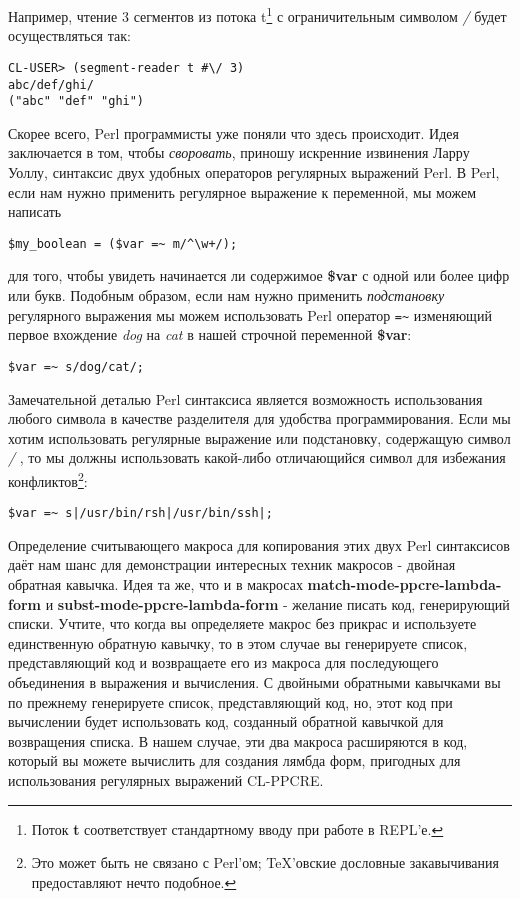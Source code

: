 Например, чтение 3 сегментов из потока t\footnote{Поток \textbf{t} соответствует стандартному вводу при работе в REPL'е.} с ограничительным символом \emph{/} будет осуществляться так:

\begin{verbatim}
CL-USER> (segment-reader t #\/ 3)
abc/def/ghi/
("abc" "def" "ghi")
\end{verbatim}

Скорее всего, Perl программисты уже поняли что здесь происходит. Идея заключается в том, чтобы \emph{своровать}, приношу искренние извинения Ларру Уоллу, синтаксис двух удобных операторов регулярных выражений Perl. В Perl, если нам нужно применить регулярное выражение к переменной, мы можем написать

\begin{verbatim}
$my_boolean = ($var =~ m/^\w+/);
\end{verbatim}

для того, чтобы увидеть начинается ли содержимое \textbf{\$var} с одной или более цифр или букв. Подобным образом, если нам нужно применить \emph{подстановку} регулярного выражения мы можем использовать Perl оператор \verb"=~" изменяющий первое вхождение \emph{dog} на \emph{cat} в нашей строчной переменной \textbf{\$var}:

\begin{verbatim}
$var =~ s/dog/cat/;
\end{verbatim}

Замечательной деталью Perl синтаксиса является возможность использования любого символа в качестве разделителя для удобства программирования. Если мы хотим использовать регулярные выражение или подстановку, содержащую символ \emph{/} , то мы должны использовать какой-либо отличающийся символ для избежания конфликтов\footnote{Это может быть не связано с Perl'ом; \TeX'овские дословные закавычивания предоставляют нечто подобное.}:

\begin{verbatim}
$var =~ s|/usr/bin/rsh|/usr/bin/ssh|;
\end{verbatim}

Определение считывающего макроса для копирования этих двух Perl синтаксисов даёт нам шанс для демонстрации интересных техник макросов - двойная обратная кавычка. Идея та же, что и в макросах \textbf{match-mode-ppcre-lambda-form} и \textbf{subst-mode-ppcre-lambda-form} - желание писать код, генерирующий списки. Учтите, что когда вы определяете макрос без прикрас и используете единственную обратную кавычку, то в этом случае вы генерируете список, представляющий код и возвращаете его из макроса для последующего объединения в выражения и вычисления. С двойными обратными кавычками вы по прежнему генерируете список, представляющий код, но, этот код при вычислении будет использовать код, созданный обратной кавычкой для возвращения списка. В нашем случае, эти два макроса расширяются в код, который вы можете вычислить для создания лямбда форм, пригодных для использования регулярных выражений CL-PPCRE.

